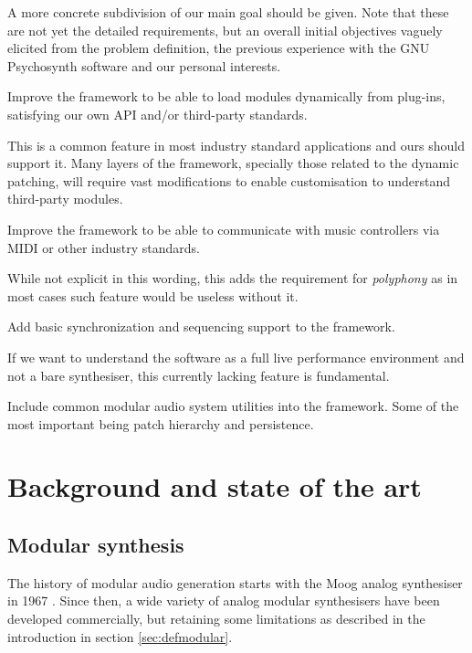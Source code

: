 A more concrete subdivision of our main goal should be given. Note
that these are not yet the detailed requirements, but an overall
initial objectives vaguely elicited from the problem definition, the
previous experience with the GNU Psychosynth software and our personal
interests.

\begin{objective}
Improve the framework to be able to load modules dynamically from
plug-ins, satisfying our own API and/or third-party standards.
\end{objective}

This is a common feature in most industry standard applications and
ours should support it. Many layers of the framework, specially those
related to the dynamic patching, will require vast modifications to
enable customisation to understand third-party modules.

\begin{objective}
Improve the framework to be able to communicate with music controllers
via MIDI or other industry standards.
\end{objective}

While not explicit in this wording, this adds the requirement for
\emph{polyphony} as in most cases such feature would be useless without
it.

\begin{objective}
Add basic synchronization and sequencing support to the framework.
\end{objective}

If we want to understand the software as a full live performance
environment and not a bare synthesiser, this currently lacking feature
is fundamental.

\begin{objective}
Include common modular audio system utilities into the framework. Some
of the most important being patch hierarchy and persistence. 
\end{objective}


\section{Background and state of the art}

\subsection{Modular synthesis}

The history of modular audio generation starts with the Moog
analog synthesiser in 1967 \cite{moog1964voltage}. Since then, a wide
variety of analog modular synthesisers have been developed
commercially, but retaining some limitations as described in the
introduction in section \ref{sec:defmodular}.

